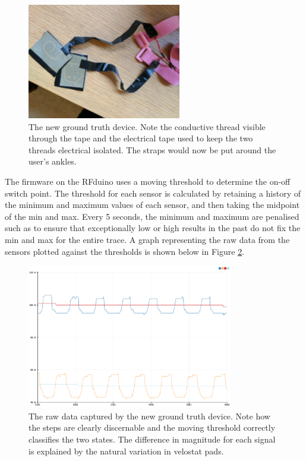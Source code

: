             \begin{figure}[!th]
                \includegraphics[width=0.6\textwidth]{Images/device_new.jpg}
                \centering
                \caption{The new ground truth device. Note the conductive thread visible through the tape and the electrical tape used to keep the two threads electrical isolated. The straps would now be put around the user's ankles.}
                \label{img_device_new}
            \end{figure}

            The firmware on the RFduino uses a moving threshold to determine the on-off switch point. The threshold for each sensor is calculated by retaining a history of the minimum and maximum values of each sensor, and then taking the midpoint of the min and max. Every 5 seconds, the minimum and maximum are penalised such as to ensure that exceptionally low or high results in the past do not fix the min and max for the entire trace. A graph representing the raw data from the sensors plotted against the thresholds is shown below in Figure \ref{img_device_new_graph}.

            \begin{figure}[!th]
                \includegraphics[width=0.8\textwidth]{Images/device_new_graph.png}
                \centering
                \caption{The raw data captured by the new ground truth device. Note how the steps are clearly discernable and the moving threshold correctly classifies the two states. The difference in magnitude for each signal is explained by the natural variation in velostat pads.}
                \label{img_device_new_graph}
            \end{figure}         


